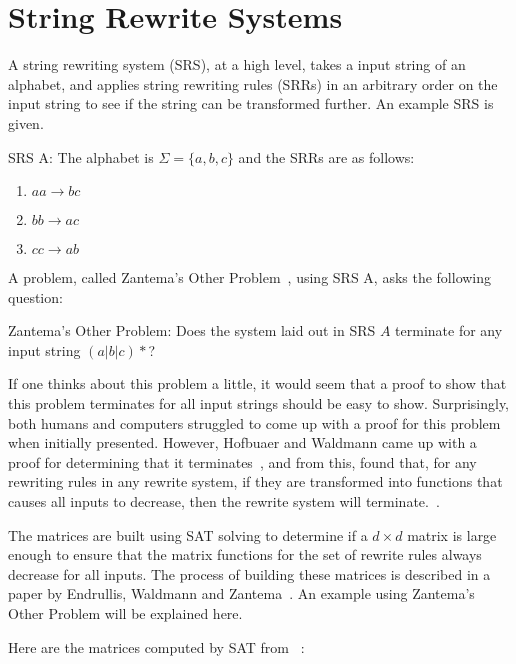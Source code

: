 \section{String Rewrite Systems}
A string rewriting system (SRS), at a high level, takes a input string of an alphabet, and applies string rewriting rules (SRRs) in an arbitrary order on the input string to see if the string can be transformed further.  An example SRS is given.
\begin{definition}{SRS A:} 
The alphabet is $\Sigma = \{a, b, c\}$ and the SRRs are as follows:
\begin{enumerate}
    \item $aa \rightarrow bc$
    \item $bb \rightarrow ac$
    \item $cc \rightarrow ab$
\end{enumerate}
\end{definition}
A problem, called Zantema's Other Problem~\cite{Hofbauer:2006:TA:1142725.1711178}, using SRS A, asks the following question:\par\noindent
\begin{question}{Zantema's Other Problem:}
Does the system laid out in SRS $A$ terminate for any input string $(a|b|c)*$?
\end{question}
If one thinks about this problem a little, it would seem that a proof to show that this problem terminates for all input strings should be easy to show.  Surprisingly, both humans and computers struggled to come up with a proof for this problem when initially presented.  However, Hofbuaer and Waldmann came up with a proof for determining that it terminates~\cite{Hofbauer:2006:TA:1142725.1711178}, and from this, found that, for any rewriting rules in any rewrite system, if they are transformed into functions that causes all inputs to decrease, then the rewrite system will terminate.~\cite{Hofbauer2006}. \par
The matrices are built using SAT solving to determine if a $d \times d$ matrix is large enough to ensure that the matrix functions for the set of rewrite rules always decrease for all inputs. The process of building these matrices is described in a paper by Endrullis, Waldmann and Zantema~\cite{Endrullis2006}. An example using Zantema's Other Problem will be explained here.\par
Here are the matrices computed by SAT from ~\cite{Hofbauer:2006:TA:1142725.1711178}:
